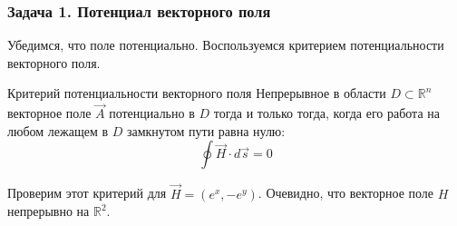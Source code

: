 \begin{frame}\frametitle{Задача 1. Потенциал векторного поля}
Убедимся, что поле потенциально.
Воспользуемся критерием потенциальности векторного поля.

\begin{block}{Критерий потенциальности векторного поля}
  Непрерывное в области \( D \subset \mathbb{R}^n \) векторное поле \(\vec A\)
  потенциально в \(D\) тогда и только тогда, когда его работа на любом лежащем в \(D\)
  замкнутом пути равна нулю:
  \begin{equation*}
    \oint \vec H \cdot d \vec s = 0
  \end{equation*}
\end{block}

Проверим этот критерий для \( \vec H = (e^x, - e^y) \).
Очевидно, что векторное поле \(H\) непрерывно на \(\mathbb{R}^2\).

\end{frame}   
